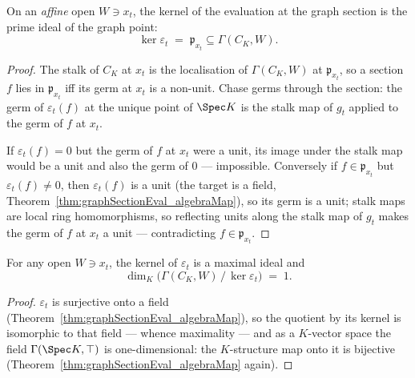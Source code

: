\begin{theorem}
  \label{thm:ker_graphSectionEval_eq_primeIdealOf}
  \leanok
  On an \emph{affine} open \(W \ni x_t\), the kernel of the evaluation at the graph section
  is the prime ideal of the graph point:
  \[
    \ker \varepsilon_t \;=\; \mathfrak p_{x_t} \subseteq \Gamma(C_K, W).
  \]
\end{theorem}
\begin{proof}
  \leanok
  The stalk of \(C_K\) at \(x_t\) is the localisation of \(\Gamma(C_K, W)\) at
  \(\mathfrak p_{x_t}\), so a section \(f\) lies in \(\mathfrak p_{x_t}\) iff its germ at
  \(x_t\) is a non-unit. Chase germs through the section: the germ of
  \(\varepsilon_t(f)\) at the unique point of \(\Spec K\) is the stalk map of \(g_t\)
  applied to the germ of \(f\) at \(x_t\).

  If \(\varepsilon_t(f) = 0\) but the germ of \(f\) at \(x_t\) were a unit, its image under
  the stalk map would be a unit and also the germ of \(0\) — impossible. Conversely if
  \(f \in \mathfrak p_{x_t}\) but \(\varepsilon_t(f) \neq 0\), then \(\varepsilon_t(f)\) is
  a unit (the target is a field, Theorem~\ref{thm:graphSectionEval_algebraMap}), so its
  germ is a unit; stalk maps are local ring homomorphisms, so reflecting units along the
  stalk map of \(g_t\) makes the germ of \(f\) at \(x_t\) a unit — contradicting
  \(f \in \mathfrak p_{x_t}\).
\end{proof}

\begin{theorem}
  \label{thm:finrank_quotient_ker_graphSectionEval}
  \leanok
  For any open \(W \ni x_t\), the kernel of \(\varepsilon_t\) is a maximal ideal and
  \[
    \dim_K \bigl(\Gamma(C_K, W) \,/\, \ker\varepsilon_t\bigr) \;=\; 1 .
  \]
\end{theorem}
\begin{proof}
  \leanok
  \(\varepsilon_t\) is surjective onto a field
  (Theorem~\ref{thm:graphSectionEval_algebraMap}), so the quotient by its kernel is
  isomorphic to that field — whence maximality — and as a \(K\)-vector space the field
  \(\Gamma(\Spec K, \top)\) is one-dimensional: the \(K\)-structure map onto it is
  bijective (Theorem~\ref{thm:graphSectionEval_algebraMap} again).
\end{proof}

